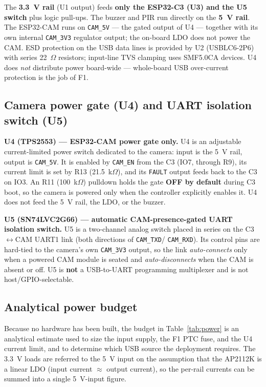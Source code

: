 \documentclass[11pt,a4paper]{article}
\begin{document}
The \textbf{3.3~V rail} (U1 output) feeds \textbf{only the ESP32-C3 (U3) and the
U5 switch} plus logic pull-ups.  The buzzer and PIR run directly on the
\textbf{5~V rail}.  The ESP32-CAM runs on \texttt{CAM\_5V} --- the gated output
of U4 --- together with its own internal \texttt{CAM\_3V3} regulator output; the
on-board LDO does not power the CAM.  ESD protection on the USB data lines is
provided by U2 (USBLC6-2P6) with series 22~$\Omega$ resistors; input-line TVS
clamping uses SMF5.0CA devices.  U4 does \emph{not} distribute power board-wide
--- whole-board USB over-current protection is the job of F1.

\subsection{Camera power gate (U4) and UART isolation switch (U5)}

\textbf{U4 (TPS2553) --- ESP32-CAM power gate only.}  U4 is an adjustable
current-limited power switch dedicated to the camera: input is the 5~V rail,
output is \texttt{CAM\_5V}.  It is enabled by \texttt{CAM\_EN} from the C3
(IO7, through R9), its current limit is set by R13 (21.5~k$\Omega$), and its
\texttt{FAULT} output feeds back to the C3 on IO3.  An R11 (100~k$\Omega$)
pulldown holds the gate \textbf{OFF by default} during C3 boot, so the camera is
powered only when the controller explicitly enables it.  U4 does not feed the
5~V rail, the LDO, or the buzzer.

\textbf{U5 (SN74LVC2G66) --- automatic CAM-presence-gated UART isolation
switch.}  U5 is a two-channel analog switch placed in series on the
C3$\leftrightarrow$CAM UART1 link (both directions of \texttt{CAM\_TXD}/%
\texttt{CAM\_RXD}).  Its control pins are hard-tied to the camera's own
\texttt{CAM\_3V3} output, so the link \emph{auto-connects} only when a powered
CAM module is seated and \emph{auto-disconnects} when the CAM is absent or off.
U5 is \textbf{not} a USB-to-UART programming multiplexer and is not
host/GPIO-selectable.

\subsection{Analytical power budget}

Because no hardware has been built, the budget in Table~\ref{tab:power} is an
analytical estimate used to size the input supply, the F1 PTC fuse, and the U4
current limit, and to determine which USB source the deployment requires.  The
3.3~V loads are referred to the 5~V input on the assumption that the AP2112K is
a linear LDO (input current $\approx$ output current), so the per-rail currents
can be summed into a single 5~V-input figure.
\end{document}
